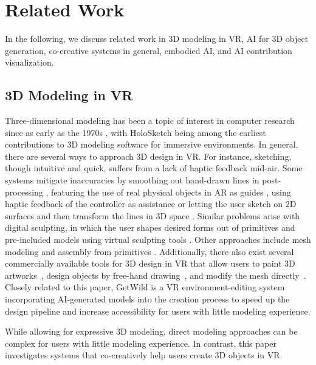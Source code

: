 \section{Related Work}
In the following, we discuss related work in 3D modeling in VR, AI for 3D object generation, co-creative systems in general, embodied AI, and AI contribution visualization.


\subsection{3D Modeling in VR}
Three-dimensional modeling has been a topic of interest in computer research since as early as the 1970s \cite{clark_designing_1976}, with HoloSketch \cite{deering_holosketch_1995} being among the earliest contributions to 3D modeling software for immersive environments. 
In general, there are several ways to approach 3D design in VR. For instance, sketching, though intuitive and quick, suffers from a lack of haptic feedback mid-air. Some systems mitigate inaccuracies by smoothing out hand-drawn lines in post-processing \cite{wesche_freedrawer_2001}, featuring the use of real physical objects in AR as guides \cite{reipschlager_designar_2019}, using haptic feedback of the controller as assistance \cite{elsayed_vrsketchpen_2020} or letting the user sketch on 2D surfaces and then transform the lines in 3D space \cite{arora_symbiosissketch_2018, jackson_lift-off_2016, wesche_freedrawer_2001, dorta_hyve-3d_2016}. Similar problems arise with digital sculpting, in which the user shapes desired forms out of primitives and pre-included models using virtual sculpting tools \cite{noauthor_transform_2020}. Other approaches include mesh modeling \cite{reipschlager_designar_2019, butterworth_3dm_1992} and assembly from primitives \cite{deering_holosketch_1995, reipschlager_designar_2019, do_3darmodeler_2010}.
Additionally, there also exist several commercially available tools for 3D design in VR that allow users to paint 3D artworks~\cite{noauthor_tilt_nodate}, design objects by free-hand drawing~\cite{noauthor_transform_2020}, and modify the mesh directly~\cite{toff_blocks_2017}.
Closely related to this paper, GetWild \cite{wong_getwild_2022} is a VR environment-editing system incorporating AI-generated models into the creation process to speed up the design pipeline and increase accessibility for users with little modeling experience. 

While allowing for expressive 3D modeling, direct modeling approaches can be complex for users with little modeling experience. 
In contrast, this paper investigates systems that co-creatively help users create 3D objects in VR.


